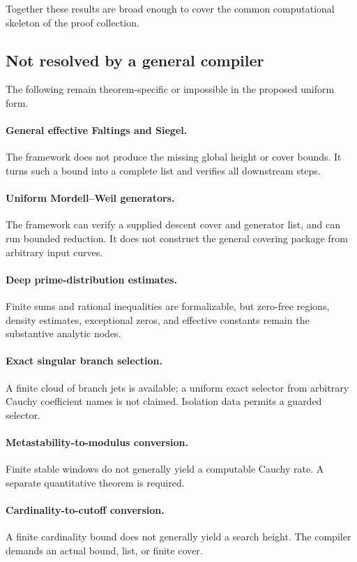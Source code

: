 Together these results are broad enough to cover the common computational
skeleton of the proof collection.

\subsection{Not resolved by a general compiler}

The following remain theorem-specific or impossible in the proposed uniform
form.

\paragraph{General effective Faltings and Siegel.}
The framework does not produce the missing global height or cover bounds.  It
turns such a bound into a complete list and verifies all downstream steps.

\paragraph{Uniform Mordell--Weil generators.}
The framework can verify a supplied descent cover and generator list, and can
run bounded reduction.  It does not construct the general covering package
from arbitrary input curves.

\paragraph{Deep prime-distribution estimates.}
Finite sums and rational inequalities are formalizable, but zero-free regions,
density estimates, exceptional zeros, and effective constants remain the
substantive analytic nodes.

\paragraph{Exact singular branch selection.}
A finite cloud of branch jets is available; a uniform exact selector from
arbitrary Cauchy coefficient names is not claimed.  Isolation data permits a
guarded selector.

\paragraph{Metastability-to-modulus conversion.}
Finite stable windows do not generally yield a computable Cauchy rate.  A
separate quantitative theorem is required.

\paragraph{Cardinality-to-cutoff conversion.}
A finite cardinality bound does not generally yield a search height.  The
compiler demands an actual bound, list, or finite cover.

